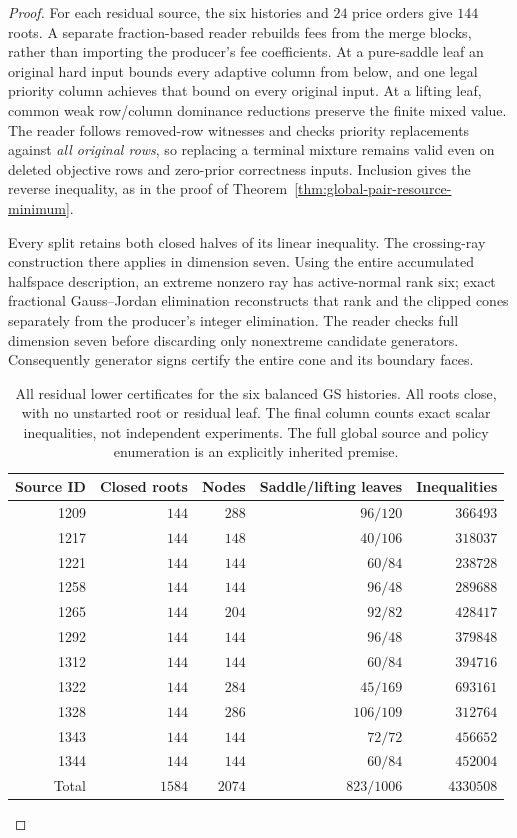 \begin{proof}
For each residual source, the six histories and $24$ price orders
give $144$ roots. A separate fraction-based reader rebuilds fees
from the merge blocks, rather than importing the producer's fee
coefficients. At a pure-saddle leaf an original hard input bounds
every adaptive column from below, and one legal priority column
achieves that bound on every original input. At a lifting leaf,
common weak row/column dominance reductions preserve the finite
mixed value. The reader follows removed-row witnesses and checks
priority replacements against \emph{all original rows}, so replacing
a terminal mixture remains valid even on deleted objective rows
and zero-prior correctness inputs. Inclusion gives the reverse
inequality, as in the proof of
Theorem~\ref{thm:global-pair-resource-minimum}.

Every split retains both closed halves of its linear inequality.
The crossing-ray construction there applies in dimension seven.
Using the entire accumulated halfspace description, an extreme
nonzero ray has active-normal rank six; exact fractional
Gauss--Jordan elimination reconstructs that rank and the clipped
cones separately from the producer's integer elimination. The
reader checks full dimension seven before discarding only
nonextreme candidate generators. Consequently generator signs
certify the entire cone and its boundary faces.

\begin{table}[ht]
\centering\small
\begin{tabular}{@{}rrrrr@{}}
\toprule
Source ID & Closed roots & Nodes & Saddle/lifting leaves & Inequalities\\
\midrule
1209 & $144$ & $288$ & $96/120$ & $366493$\\
1217 & $144$ & $148$ & $40/106$ & $318037$\\
1221 & $144$ & $144$ & $60/84$ & $238728$\\
1258 & $144$ & $144$ & $96/48$ & $289688$\\
1265 & $144$ & $204$ & $92/82$ & $428417$\\
1292 & $144$ & $144$ & $96/48$ & $379848$\\
1312 & $144$ & $144$ & $60/84$ & $394716$\\
1322 & $144$ & $284$ & $45/169$ & $693161$\\
1328 & $144$ & $286$ & $106/109$ & $312764$\\
1343 & $144$ & $144$ & $72/72$ & $456652$\\
1344 & $144$ & $144$ & $60/84$ & $452004$\\
\midrule
Total & $1584$ & $2074$ & $823/1006$ & $4330508$\\
\bottomrule
\end{tabular}
\caption{All residual lower certificates for the six balanced GS
histories. All roots close, with no unstarted root or residual leaf.
The final column counts exact scalar inequalities, not independent
experiments. The full global source and policy enumeration is an
explicitly inherited premise.}
\label{tab:gs-balanced-lower}
\end{table}


\end{proof}
